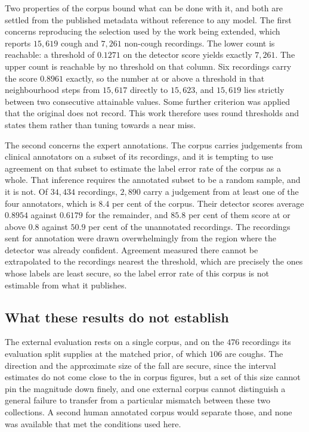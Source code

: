 Two properties of the corpus bound what can be done with it, and both are settled from the
published metadata without reference to any model. The first concerns reproducing the
selection used by the work being extended, which reports $15{,}619$ cough and $7{,}261$
non-cough recordings. The lower count is reachable: a threshold of $0.1271$ on the detector
score yields exactly $7{,}261$. The upper count is reachable by no threshold on that
column. Six recordings carry the score $0.8961$ exactly, so the number at or above a
threshold in that neighbourhood steps from $15{,}617$ directly to $15{,}623$, and
$15{,}619$ lies strictly between two consecutive attainable values. Some further criterion
was applied that the original does not record. This work therefore uses round thresholds
and states them rather than tuning towards a near miss.

The second concerns the expert annotations. The corpus carries judgements from clinical
annotators on a subset of its recordings, and it is tempting to use agreement on that
subset to estimate the label error rate of the corpus as a whole. That inference requires
the annotated subset to be a random sample, and it is not. Of $34{,}434$ recordings,
$2{,}890$ carry a judgement from at least one of the four annotators, which is $8.4$ per
cent of the corpus. Their detector scores average $0.8954$ against $0.6179$ for the
remainder, and $85.8$ per cent of them score at or above $0.8$ against $50.9$ per cent of
the unannotated recordings. The recordings sent for
annotation were drawn overwhelmingly from the region where the detector was already
confident. Agreement measured there cannot be extrapolated to the recordings nearest the
threshold, which are precisely the ones whose labels are least secure, so the label error
rate of this corpus is not estimable from what it publishes.

\subsection{What these results do not establish}\label{sec:res-limits}

The external evaluation rests on a single corpus, and on the $476$ recordings its
evaluation split supplies at the matched prior, of which $106$ are coughs. The direction
and the approximate size of the fall are secure, since the interval estimates do not come
close to the in corpus figures, but a set of this size cannot pin the magnitude down
finely, and one external corpus cannot distinguish a general failure to transfer from a
particular mismatch between these two collections. A second human annotated corpus would
separate those, and none was available that met the conditions used here.

